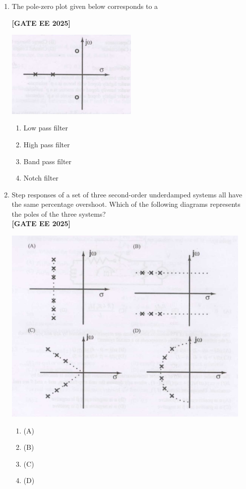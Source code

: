 \documentclass[12pt]{article}
\begin{document}
\begin{enumerate}[leftmargin=2.5em, label=\textbf{Q.\arabic*}., itemsep=2em]
\item The pole-zero plot given below corresponds to a
 
\noindent \textbf{[GATE EE 2025]}
\begin{center}
\includegraphics[width=0.5\textwidth]{figs/q11.png}
\end{center}
\begin{enumerate}[label=(\Alph*)]
    \item Low pass filter
    \item High pass filter
    \item Band pass filter
    \item Notch filter
\end{enumerate}

\item Step responses of a set of three second-order underdamped systems all have the same percentage overshoot. Which of the following diagrams represents the poles of the three systems?\\
 
\noindent \textbf{[GATE EE 2025]}
\begin{center}
\includegraphics[width=0.95\textwidth]{figs/q12.png}
\end{center}
\begin{enumerate}[label=(\Alph*)]
  \item (A)
  \item (B)
  \item (C)
  \item (D)
\end{enumerate}


\end{enumerate}
\end{document}
